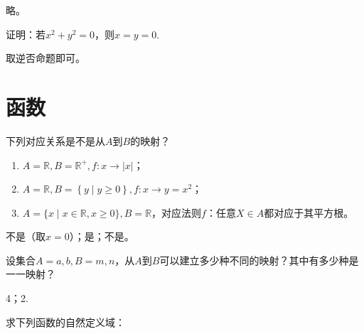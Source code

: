 \documentclass[lang=cn,newtx,10pt,scheme=chinese]{elegantbook}
\begin{document}
\begin{solution}
  略。
\end{solution}

\begin{exercise}\label{2003RJA_xx2-1_P7.exp4}
  证明：若$x^2+y^2=0$，则$x=y=0$.
\end{exercise}

\begin{solution}
  取逆否命题即可。
\end{solution}

\chapter{函数}

\begin{exercise}\label{HS2FZ_lkb1_P34_exp.4,BJSZ_Algebra1_P40}
  下列对应关系是不是从$A$到$B$的映射？
\end{exercise}

\begin{enumerate}
  \item $A=\mathbb{R},B=\mathbb{R}^{+},f:x\rightarrow\left|x\right|$；
  \item $A=\mathbb{R},B=\left\{y\mid y\geqslant 0\right\},f:x\rightarrow y=x^2$；
  \item $A=\{x\mid x\in\mathbb{R},x\geqslant0\},B=\mathbb{R}$，对应法则$f$：任意$X\in A$都对应于其平方根。
\end{enumerate}

\begin{solution}
  不是（取$x=0$）；是；不是。
\end{solution}

\begin{exercise}
  设集合$A={a,b},B={m,n}$，从$A$到$B$可以建立多少种不同的映射？其中有多少种是一一映射？
\end{exercise}

\begin{solution}
  4；2.
\end{solution}

\begin{exercise}
  求下列函数的自然定义域：
\end{exercise}
\end{document}
